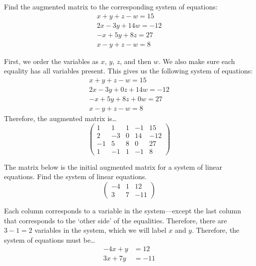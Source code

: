 \documentclass[11pt,letterpaper]{article}
\begin{document}

 Find the augmented matrix to the corresponding system of equations:
	\[
	\begin{gathered}
	x + y + z - w= 15 \\
	2x - 3y + 14w= -12 \\
	-x + 5y + 8z= 27 \\
	x - y + z - w= 8
	\end{gathered}
	\] \pspace

\sol First, we order the variables as $x$, $y$, $z$, and then $w$. We also make sure each equality has all variables present. This gives us the following system of equations:
	\[
	\begin{gathered}
	x + y + z - w= 15 \\
	2x - 3y + 0z + 14w= -12 \\
	-x + 5y + 8z + 0w= 27 \\
	x - y + z - w= 8
	\end{gathered}
	\]
Therefore, the augmented matrix is\dots
	\[
	\begin{pmatrix}
	1 & 1 & 1 & -1 & 15 \\
	2 & -3 & 0 & 14 & -12 \\
	-1 & 5 & 8 & 0 & 27 \\
	1 & -1 & 1 & -1 & 8
	\end{pmatrix}
	\]



\newpage



 The matrix below is the initial augmented matrix for a system of linear equations. Find the system of linear equations. 
	\[
	\begin{pmatrix}
	-4 & 1 & 12 \\
	3 & 7 & -11
	\end{pmatrix}
	\] \pspace

\sol Each column corresponds to a variable in the system---except the last column that corresponds to the `other side' of the equalities. Therefore, there are $3 - 1= 2$ variables in the system, which we will label $x$ and $y$. Therefore, the system of equations must be\dots
	\[
	\begin{aligned}
	-4x + y&= 12 \\
	3x + 7y&= -11
	\end{aligned}
	\]
\end{document}
